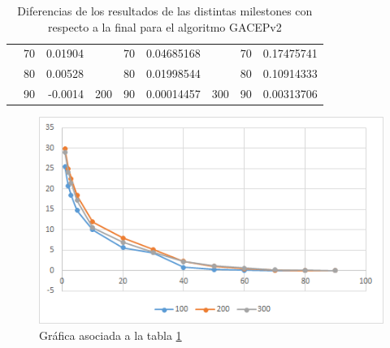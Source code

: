 \begin{table}[]
\begin{tabular}{|ccrccrccr|}
\rowcolor[HTML]{DAE8FC} 
\multicolumn{1}{|c|}{\cellcolor[HTML]{FFFFC7}}                       & \multicolumn{1}{c|}{\cellcolor[HTML]{DAE8FC}70}        & \multicolumn{1}{r|}{\cellcolor[HTML]{DAE8FC}0.01904}    & \multicolumn{1}{c|}{\cellcolor[HTML]{FFFFC7}}                       & \multicolumn{1}{c|}{\cellcolor[HTML]{DAE8FC}70}        & \multicolumn{1}{r|}{\cellcolor[HTML]{DAE8FC}0.04685168} & \multicolumn{1}{c|}{\cellcolor[HTML]{FFFFC7}}                       & \multicolumn{1}{c|}{\cellcolor[HTML]{DAE8FC}70}        & 0.17475741                                              \\ \cline{2-3} \cline{5-6} \cline{8-9} 
\rowcolor[HTML]{DDFDFF} 
\multicolumn{1}{|c|}{\cellcolor[HTML]{FFFFC7}}                       & \multicolumn{1}{c|}{\cellcolor[HTML]{DDFDFF}80}        & \multicolumn{1}{r|}{\cellcolor[HTML]{DDFDFF}0.00528}    & \multicolumn{1}{c|}{\cellcolor[HTML]{FFFFC7}}                       & \multicolumn{1}{c|}{\cellcolor[HTML]{DDFDFF}80}        & \multicolumn{1}{r|}{\cellcolor[HTML]{DDFDFF}0.01998544} & \multicolumn{1}{c|}{\cellcolor[HTML]{FFFFC7}}                       & \multicolumn{1}{c|}{\cellcolor[HTML]{DDFDFF}80}        & 0.10914333                                              \\ \cline{2-3} \cline{5-6} \cline{8-9} 
\rowcolor[HTML]{DAE8FC} 
\multicolumn{1}{|c|}{\multirow{-13}{*}{\cellcolor[HTML]{FFFFC7}100}} & \multicolumn{1}{c|}{\cellcolor[HTML]{DAE8FC}90}        & \multicolumn{1}{r|}{\cellcolor[HTML]{DAE8FC}-0.0014}    & \multicolumn{1}{c|}{\multirow{-13}{*}{\cellcolor[HTML]{FFFFC7}200}} & \multicolumn{1}{c|}{\cellcolor[HTML]{DAE8FC}90}        & \multicolumn{1}{r|}{\cellcolor[HTML]{DAE8FC}0.00014457} & \multicolumn{1}{c|}{\multirow{-13}{*}{\cellcolor[HTML]{FFFFC7}300}} & \multicolumn{1}{c|}{\cellcolor[HTML]{DAE8FC}90}        & 0.00313706                                              \\ \hline
\end{tabular}
\caption{\label{DiferenciasGACEP_GRASP}Diferencias de los resultados de las distintas milestones con respecto a la final para el algoritmo GACEPv2}
\end{table}

\begin{figure}[h]
		\centering
		\includegraphics[scale=1]{imagenes/Experimental/DiferenciasGACEP_GRASP.png}
        \caption{Gráfica asociada a la tabla \ref{DiferenciasGACEP_GRASP}}
        \label{fig:DiferenciasGACEP}
\end{figure}

